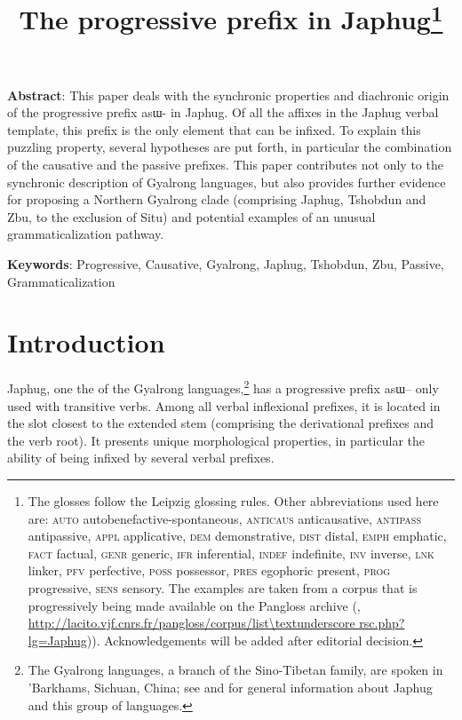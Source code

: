 \documentclass[oldfontcommands,oneside,a4paper,11pt]{article}
\newcommand{\ipa}[1]{{\phon \mbox{#1}}} %
\begin{document}
 
\title{The progressive prefix in Japhug\footnote{The glosses follow the Leipzig glossing rules. Other abbreviations used here are: \textsc{auto}  autobenefactive-spontaneous, \textsc{anticaus} anticausative, \textsc{antipass} antipassive, \textsc{appl} applicative, \textsc{dem} demonstrative,  \textsc{dist} distal, \textsc{emph} emphatic, \textsc{fact} factual, \textsc{genr} generic, \textsc{ifr} inferential, \textsc{indef} indefinite, \textsc{inv} inverse,  \textsc{lnk} linker, \textsc{pfv} perfective, \textsc{poss} possessor, \textsc{pres} egophoric present, \textsc{prog} progressive, \textsc{sens} sensory. The examples are taken from a corpus that is progressively being made available on the Pangloss archive (\citealt{michailovsky14pangloss},  \url{http://lacito.vjf.cnrs.fr/pangloss/corpus/list\textunderscore rsc.php?lg=Japhug})). %
Acknowledgements will be added after editorial decision.
} }
\maketitle

\textbf{Abstract}: This paper deals with the synchronic properties and diachronic origin of the progressive prefix asɯ- in Japhug. Of all the affixes in the Japhug verbal template, this prefix is the only element that can be infixed. To explain this puzzling property, several hypotheses are put forth, in particular the combination of the causative and the passive prefixes. This paper contributes not only to the synchronic description of Gyalrong languages, but also provides further evidence for proposing a Northern Gyalrong clade (comprising Japhug, Tshobdun and Zbu, to the exclusion of Situ) and potential examples of an unusual grammaticalization pathway.

\textbf{Keywords}: Progressive, Causative, Gyalrong, Japhug, Tshobdun, Zbu, Passive, Grammaticalization

\section{Introduction}
Japhug, one the of the Gyalrong languages,\footnote{The Gyalrong languages, a branch of the Sino-Tibetan family, are spoken in 'Barkhams, Sichuan, China; see \citet{jacques17sketch} and \citet{jackson14morpho} for general information about Japhug and this group of languages.} has a progressive prefix \ipa{asɯ--} only used with transitive verbs. Among all verbal inflexional prefixes, it is located in the slot closest to the extended stem (comprising the derivational prefixes and the verb root). It presents unique morphological properties, in particular the ability of being infixed by several verbal prefixes.
\end{document}
